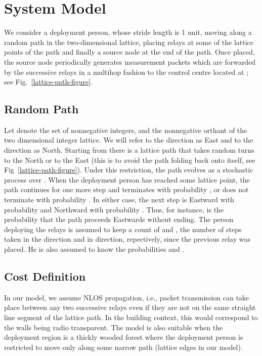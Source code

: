 \documentclass[conference]{IEEEtran}
\begin{document}
\section{System Model} \label{system_model_section} We consider a
deployment person, whose stride length is 1 unit, moving along a
random path in the two-dimensional lattice, placing relays at some of
the lattice points of the path and finally a source node at the end of
the path. Once placed, the source node periodically generates
measurement packets which are forwarded by the successive relays in a
multihop fashion to the control centre located at ; see
Fig.~\ref{lattice-path-figure}.

\subsection{Random Path}

Let  denote the set of nonnegative integers, and
 the nonnegative orthant of the two dimensional
integer lattice. We will refer to the  direction as East
and to the  direction as North. Starting from 
there is a lattice path that takes random turns to the North or to the
East (this is to avoid the path folding back onto itself, see
Fig~\ref{lattice-path-figure}). Under this restriction, the path
evolves as a stochastic process over . When the
deployment person has reached some lattice point, the path continues
for one more step and terminates with probability , or does not
terminate with probability . In either case, the next step is
Eastward with probability  and Northward with probability .
Thus, for instance,  is the probability that the path proceeds
Eastwards without ending. The person deploying the relays is assumed
to keep a count of  and , the number of steps taken in the
 direction and in  direction, repectively,
since the previous relay was placed. He is also assumed to know the
probabilities  and .

\subsection{Cost Definition}

In our model, we assume NLOS propagation, i.e., packet transmission can take place between any two 
successive relays even if they are not on the same straight line segment of the lattice path. In the 
building context, this would correspond to the walls being radio transparent. The model is also suitable 
when the deployment region is a thickly wooded forest where the deployment person is restricted to move 
only along some narrow path (lattice edges in our model). 
\end{document}
